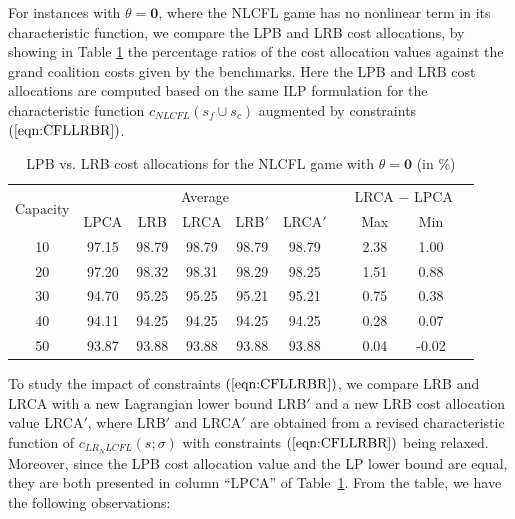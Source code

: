 \documentclass[ijoc,nonblindrev]{informs3} %
\begin{document}
For instances with $\theta=\textbf{0}$, where the NLCFL game has no nonlinear term in its characteristic function, we compare the LPB and LRB cost allocations, by showing in Table \ref{table:LRBLPBSG} the percentage ratios of the cost allocation values against the grand coalition costs given by the benchmarks. Here the LPB and LRB cost allocations are computed based on the same ILP formulation for the characteristic function $c_{NLCFL}(s_f \cup s_c)$ augmented by constraints $(\ref{eqn:CFLLRBR})$.


\begin{table}[H]
\vspace{-2mm}
\centering
\tabcolsep=14pt
\small
\renewcommand\arraystretch{1.5}
\caption{\label{table:LRBLPBSG}LPB vs. LRB cost allocations for the NLCFL game with $\theta = \textbf{0}$ (in \%)}
\begin{tabular}[!h]{c c c c c c c c c c}
\hline
\multirow{2}{*}{Capacity} & \multicolumn{5}{c}{Average}	&\multicolumn{1}{c}{} & \multicolumn{2}{c}{LRCA $-$ LPCA}\\
\cline{2-6}
\cline{8-9}
& LPCA & LRB & LRCA	& LRB$'$ & LRCA$'$	& &Max	&Min\\
\hline
10    &97.15	&98.79	&98.79	&98.79	&98.79	&	&2.38	&1.00\\

20    &97.20	&98.32	&98.31	&98.29	&98.25	&	&1.51	&0.88\\

30    &94.70	&95.25	&95.25	&95.21	&95.21	&	&0.75	&0.38\\

40    &94.11	&94.25	&94.25	&94.25	&94.25	&	&0.28	&0.07\\

50    &93.87	&93.88	&93.88	&93.88	&93.88	&	&0.04	&-0.02\\
\hline
\end{tabular}
\vspace{-3mm}
\end{table}
To study the impact of constraints $(\ref{eqn:CFLLRBR})$, we compare LRB and LRCA with a new Lagrangian lower bound LRB$'$ and a new LRB cost allocation value LRCA$'$, where LRB$'$ and LRCA$'$ are obtained from a revised characteristic function of $c_{LR_NLCFL}(s;\sigma)$ with constraints $(\ref{eqn:CFLLRBR})$ being relaxed. Moreover,
since the LPB cost allocation value and the LP lower bound are equal, they are both presented in column ``LPCA'' of Table~\ref{table:LRBLPBSG}.
From the table, we have the following observations:
\end{document}
